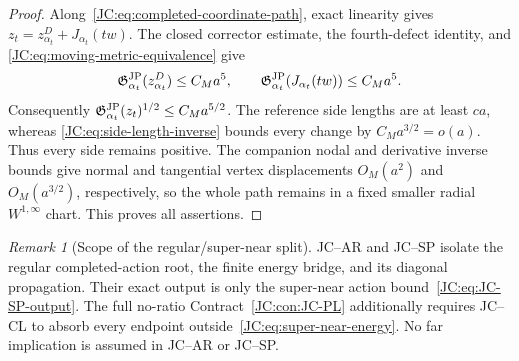\documentclass[11pt]{amsart}
\numberwithin{equation}{section}
\theoremstyle{definition}
\theoremstyle{remark}
\newtheorem{remark}[theorem]{Remark}
\newcommand{\Gjp}{\mathfrak G^{\rm JP}}
\begin{document}
\begin{proof}
Along~\eqref{JC:eq:completed-coordinate-path}, exact linearity gives
$z_t=z_{\alpha_t}^D+J_{\alpha_t}(tw)$.  The closed corrector estimate,
the fourth-defect identity, and
\eqref{JC:eq:moving-metric-equivalence} give
\[
 \Gjp_{\alpha_t}(z_{\alpha_t}^D)\le C_Ma^5,
 \qquad
 \Gjp_{\alpha_t}(J_{\alpha_t}(tw))\le C_Ma^5.
\]
Consequently $\Gjp_{\alpha_t}(z_t)^{1/2}\le C_Ma^{5/2}$.
The reference side lengths are at least $ca$, whereas
\eqref{JC:eq:side-length-inverse} bounds every change by
$C_Ma^{3/2}=o(a)$.  Thus every side remains positive.  The companion
nodal and derivative inverse bounds give normal and tangential vertex
displacements $O_M(a^2)$ and $O_M(a^{3/2})$, respectively, so the whole
path remains in a fixed smaller radial $W^{1,\infty}$ chart.  This proves
all assertions.
\end{proof}

\begin{remark}[Scope of the regular/super-near split]
JC--AR and JC--SP isolate the regular completed-action root, the finite
energy bridge, and its diagonal propagation.  Their exact output is only
the super-near action bound~\eqref{JC:eq:JC-SP-output}.  The full no-ratio
Contract~\ref{JC:con:JC-PL} additionally requires JC--CL to absorb every
endpoint outside~\eqref{JC:eq:super-near-energy}.  No far implication is
assumed in JC--AR or JC--SP.
\end{remark}
\end{document}
